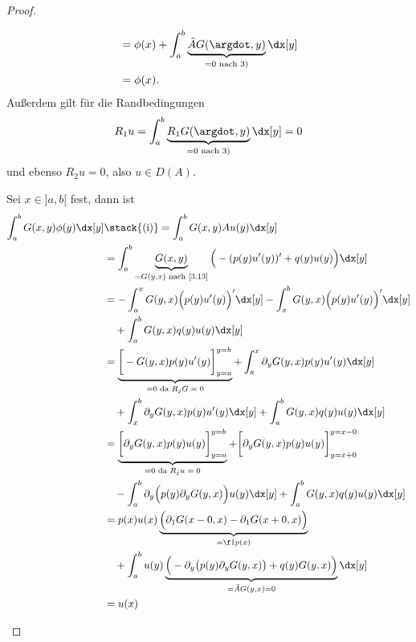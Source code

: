 \begin{st}
\begin{proof}
\begin{seg}[(ii) $\implies$ (i)]
\begin{align*}
				&= \phi(x) + \int_a^b \underbrace{\tilde A G (\argdot, y)}_{=0 \text{ nach 3)}} \dx[y] \\
				&= \phi(x). %
			\end{align*}
			Außerdem gilt für die Randbedingungen
			\[
				R_1 u = \int_a^b \underbrace{R_1G(\argdot, y)}_{=0 \text{ nach 3)}} \dx[y] = 0
			\]
			und ebenso $R_2 u = 0$, also $u \in D(A)$.
		\end{seg}
		\begin{seg}[(i) $\implies$ (ii)]
			Sei $x \in ]a,b[$ fest, dann ist
			\begin{align*}
				\int_a^b G(x,y) \phi(y) \dx[y]
				&\stack{\text{(i)}}= \int_a^b G(x,y) Au(y) \dx[y] \\
				&= \int_a^b \underbrace{G(x,y)}_{=G(y,x) \text{ nach \ref{3.13}}} \Big( -(p(y)u'(y) )' + q(y)u(y) \Big) \dx[y] \\
				&= -\int_a^x G(y,x) \Big(p(y)u'(y)\Big)' \dx[y] - \int_x^b G(y,x) \Big(p(y)u'(y)\Big)' \dx[y] \\
					&\quad + \int_a^b G(y,x) q(y) u(y) \dx[y] \\
				&= \underbrace{\bigg[ -G(y,x)p(y)u'(y) \bigg]^{y=b}_{y=a}}_{=0 \text{ da $R_j G = 0$}} + \int_a^x \partial_y G(y,x) p(y)u'(y) \dx[y] \\ 
					&\quad + \int_x^b \partial_y G(y,x) p(y) u'(y) \dx[y] + \int_a^b G(y,x) q(y)u(y) \dx[y] \\
				&= \underbrace{\bigg[ \partial_y G(y,x) p(y) u(y) \bigg]^{y=b}_{y=a}}_{=0 \text{ da $R_j u = 0$}} + \bigg[ \partial_y G(y,x) p(y) u(y) \bigg]_{y=x+0}^{y=x-0} \\
					&\quad - \int_a^b \partial_y \Big( p(y) \partial_y G(y,x) \Big) u(y) \dx[y] + \int_a^b G(y,x) q(y) u(y) \dx[y] \\
				&= p(x)u(x) \underbrace{\Big( \partial_1 G(x-0,x) - \partial_1 G(x+0,x) \Big)}_{= \f 1{p(x)}} \\
					&\quad + \int_a^b u(y) \underbrace{\Big(- \partial_y \big( p(y) \partial_y G(y,x) \big) + q(y) G(y,x)\Big)}_{=\tilde A G(y,x) = 0} \dx[y] \\
				&= u(x)
			\end{align*}
		\end{seg}
	\end{proof}
\end{st}

